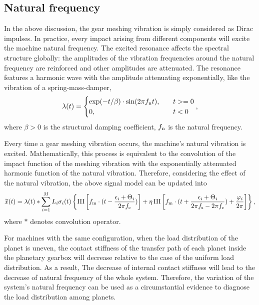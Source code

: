 \documentclass[a4paper,fleqn]{cas-sc}%
\begin{document}
\subsection{Natural frequency\label{sec:natural_frequency}}
\par In the above discussion, the gear meshing vibration is simply considered as Dirac impulses. In practice, every impact arising from different components will excite the machine natural frequency. The excited resonance affects the spectral structure globally: the amplitudes of the vibration frequencies around the natural frequency are reinforced and other amplitudes are attenuated. The resonance features a harmonic wave with the amplitude attenuating exponentially, like the vibration of a spring-mass-damper,
\begin{equation}
    \lambda(t)=\begin{cases}
        \exp(-t/\beta)\cdot \sin(2 \pi f_{\rm n} t),\quad & t>=0\\
        0, & t<0
    \end{cases},
\end{equation}
where $\beta>0$ is the structural damping coefficient, $f_{\rm n}$ is the natural frequency.
\par Every time a gear meshing vibration occurs, the machine's natural vibration is excited. Mathematically, this process is equivalent to the convolution of the impact function of the meshing vibration with the exponentially attenuated harmonic function of the natural vibration. Therefore, considering the effect of the natural vibration, the above signal model can be updated into
\begin{equation}
    \widetilde{x} (t)=\lambda(t) \ast \sum_{i=1}^{M} L_i \sigma_i(t) \left\{ \operatorname{III}\left[f_{\rm m} \cdot (t-\frac{\epsilon_i+\Theta_i}{2 \pi f_{\rm c}})\right]%
    + \eta \operatorname{III}\left[f_{\rm m} \cdot (t + \frac{\epsilon_i+\Theta_i}{2 \pi f_{\rm s}-2 \pi f_{\rm c}}) + \frac{\varphi_i}{2 \pi} \right]%
    \right\},\label{eq:final_signal_model}
\end{equation}
where $\ast$ denotes convolution operator.
\par For machines with the same configuration, when the load distribution of the planet is uneven, the contact stiffness of the transfer path of each planet inside the planetary gearbox will decrease relative to the case of the uniform load distribution. As a result, The decrease of internal contact stiffness will lead to the decrease of natural frequency of the whole system. Therefore, the variation of the system's natural frequency can be used as a circumstantial evidence to diagnose the load distribution among planets.
\end{document}
